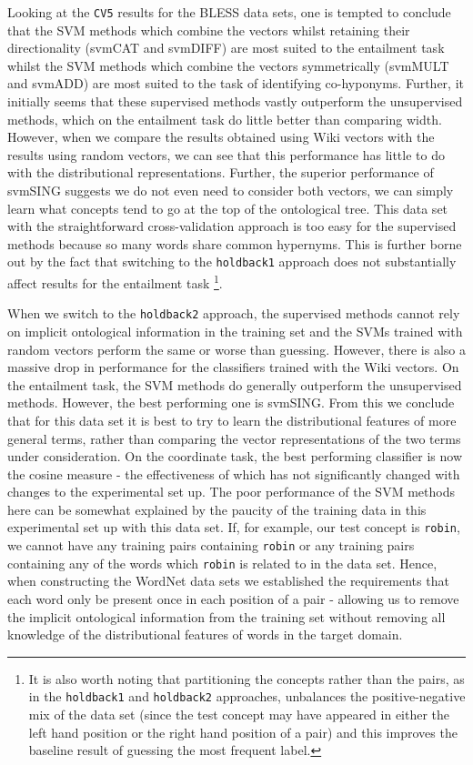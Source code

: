 \documentclass[11pt]{article}
\begin{document}
Looking at the \texttt{CV5} results for the BLESS data sets, one is tempted to conclude that the SVM methods which combine the vectors whilst retaining their directionality (svmCAT and svmDIFF) are most suited to the entailment task whilst the SVM methods which combine the vectors symmetrically (svmMULT and svmADD) are most suited to the task of identifying co-hyponyms.  Further, it initially seems that these supervised methods vastly outperform the unsupervised methods, which on the entailment task do little better than comparing width.  However, when we compare the results obtained using Wiki vectors with the results using random vectors, we can see that this performance has little to do with the distributional representations.  Further, the superior performance of svmSING suggests we do not even need to consider both vectors, we can simply learn what concepts tend to go at the top of the ontological tree.  This data set with the straightforward cross-validation approach is too easy for the supervised methods because so many words share common hypernyms.  This is further borne out by the fact that switching to the \texttt{holdback1} approach does not substantially affect results for the entailment task \footnote{It is also worth noting that partitioning the concepts rather than the pairs, as in the \texttt{holdback1} and \texttt{holdback2} approaches,  unbalances the positive-negative mix of the data set (since the test concept may have appeared in either the left hand position or the right hand position of a pair) and this improves the baseline result of guessing the most frequent label.}.

When we switch to the \texttt{holdback2} approach, the supervised methods cannot rely on implicit ontological information in the training set and the SVMs trained with random vectors perform the same or worse than guessing.  However, there is also a massive drop in performance for the classifiers trained with the Wiki vectors.   On the entailment task, the SVM methods do generally outperform the unsupervised methods.  However, the best performing one is svmSING.  From this we conclude that for this data set it is best to try to learn the distributional features of more general terms, rather than comparing the vector representations of the two terms under consideration.   On the coordinate task, the best performing classifier is now the cosine measure - the effectiveness of which has not significantly changed with changes to the experimental set up.   The poor performance of the SVM methods here can be somewhat explained by the paucity of the training data in this experimental set up with this data set.  If, for example, our test concept is \texttt{robin}, we cannot have any training pairs containing \texttt{robin} or any training pairs containing any of the words which \texttt{robin} is related to in the data set.  Hence, when constructing the WordNet data sets we established the requirements that each word only be present once in each position of a pair - allowing us to remove the implicit ontological information from the training set without removing all knowledge of the distributional features of words in the target domain.
\end{document}
